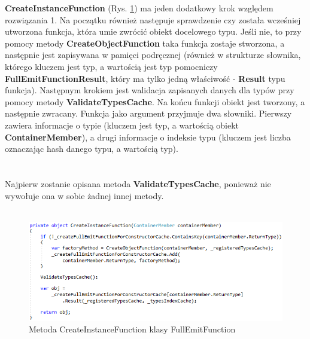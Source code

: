 \documentclass[12pt]{article}
\begin{document}
\textbf{CreateInstanceFunction} (Rys. \ref{fig:FullEmitFunction_CreateInstanceFunction}) ma jeden dodatkowy krok względem rozwiązania 1. Na początku również następuje sprawdzenie czy została wcześniej utworzona funkcja, która umie zwrócić obiekt docelowego typu. Jeśli nie, to przy pomocy metody \textbf{CreateObjectFunction} taka funkcja zostaje stworzona, a następnie jest zapisywana w pamięci podręcznej (również w strukturze słownika, którego kluczem jest typ, a wartością jest typ pomocniczy \textbf{FullEmitFunctionResult}, który ma tylko jedną właściwość - \textbf{Result} typu funkcja). Następnym krokiem jest walidacja zapisanych danych dla typów przy pomocy metody \textbf{ValidateTypesCache}. Na końcu funkcji obiekt jest tworzony, a następnie zwracany. Funkcja jako argument przyjmuje dwa słowniki. Pierwszy zawiera informacje o typie (kluczem jest typ, a wartością obiekt \textbf{ContainerMember}), a drugi informacje o indeksie typu (kluczem jest liczba oznaczając hash danego typu, a wartością typ).\\
\\
\\
Najpierw zostanie opisana metoda \textbf{ValidateTypesCache}, ponieważ nie wywołuje ona w sobie żadnej innej metody.\\ \\
\begin{figure}[H]
	\begin{center}
  		\includegraphics{FullEmitFunction_CreateInstanceFunction.png}
  		\caption{Metoda CreateInstanceFunction klasy FullEmitFunction}
  		\label{fig:FullEmitFunction_CreateInstanceFunction}
	\end{center}
\end{figure}
\end{document}
